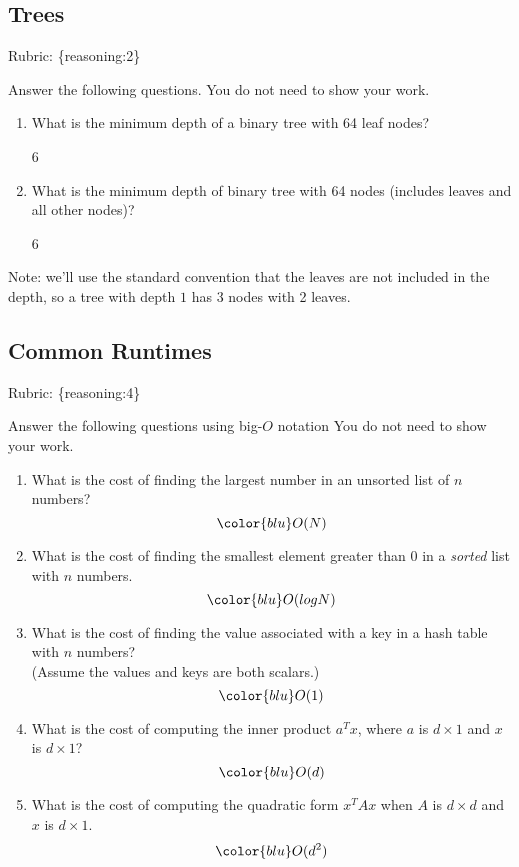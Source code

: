 \documentclass{article}
\def\rubric#1{\gre{Rubric: \{#1\}}}{}
\def\blu#1{{\color{blu}#1}}
\def\gre#1{{\color{gre}#1}}
\begin{document}
\subsection{Trees}
\rubric{reasoning:2}

\blu{Answer the following questions.} You do not need to show your work.

\begin{enumerate}
\item What is the minimum depth of a binary tree with 64 leaf nodes?
\begin{center}\color{blu} 6 \end{center}
\item What is the minimum depth of binary tree with 64 nodes (includes leaves and all other nodes)?
\begin{center}\color{blu} 6 \end{center}
\end{enumerate}
Note: we'll use the standard convention that the leaves are not included in the depth, so a tree with depth $1$ has 3 nodes with 2 leaves.

\subsection{Common Runtimes}
\rubric{reasoning:4}

\blu{Answer the following questions using big-$O$ notation} You do not need to show your work.
\begin{enumerate}
\item What is the cost of finding the largest number in an unsorted list of $n$ numbers?
\begin{equation}\color{blu} O(N) \end{equation}
\item What is the cost of finding the smallest element greater than 0 in a \emph{sorted} list with $n$ numbers.
\begin{equation}\color{blu} O(logN) \end{equation}
\item What is the cost of finding the value associated with a key in a hash table with $n$ numbers? \\(Assume the values and keys are both scalars.)
\begin{equation}\color{blu} O(1) \end{equation}
\item What is the cost of computing the inner product $a^Tx$, where $a$ is $d \times 1$ and $x$ is $d \times 1$?
\begin{equation}\color{blu} O(d) \end{equation}
\item What is the cost of computing the quadratic form $x^TAx$ when $A$ is $d \times d$ and $x$ is $d \times 1$.
\begin{equation}\color{blu} O(d^{2}) \end{equation}
\end{enumerate}
\end{document}
